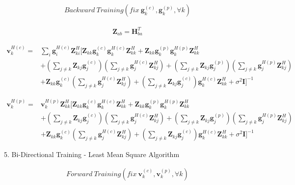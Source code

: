 \documentclass[11pt, oneside]{article}   	%
\begin{document}
\begin{align*}
Backward\ Training (fix\  \textbf{g}^{(c)}_{k}, \textbf{g}^{(p)}_{k}, \forall k)
\end{align*}

\begin{align*}
\textbf{Z}_{ab}=\textbf{H}^{T}_{ba}
\end{align*}

\begin{align*}
\textbf{v}^{H(c)}_{k} = &\displaystyle\sum_{i}	\textbf{g}^{H(c)}_{i}	\textbf{Z}^{H}_{ki} 
[
\textbf{Z}_{kk}	\textbf{g}^{(c)}_{k}	\textbf{g}^{H(c)}_{k}	\textbf{Z}^{H}_{kk}
+\textbf{Z}_{kk}	\textbf{g}^{(p)}_{k}	\textbf{g}^{H(p)}_{k}	\textbf{Z}^{H}_{kk}	\\
&+(\displaystyle\sum_{j \neq k}\textbf{Z}_{kj}\textbf{g}^{(c)}_{j})
(\displaystyle\sum_{j \neq k}\textbf{g}^{H(c)}_{j}\textbf{Z}^{H}_{kj})
+(\displaystyle\sum_{j \neq k}\textbf{Z}_{kj}\textbf{g}^{(p)}_{j})
(\displaystyle\sum_{j \neq k}\textbf{g}^{H(p)}_{j}\textbf{Z}^{H}_{kj})	\\
&+\textbf{Z}_{kk}	\textbf{g}^{(c)}_{k}
(\displaystyle\sum_{j \neq k}\textbf{g}^{H(c)}_{j}\textbf{Z}^{H}_{kj})
+(\displaystyle\sum_{j \neq k}\textbf{Z}_{kj}\textbf{g}^{(c)}_{j})
\textbf{g}^{H(c)}_{k}	\textbf{Z}^{H}_{kk}
+\sigma^2	\textbf{I}
]^{-1}	
\end{align*}

\begin{align*}
\textbf{v}^{H(p)}_{k} = &\textbf{v}^{H(p)}_{k}	\textbf{Z}^{H}_{kk} 
[
\textbf{Z}_{kk}	\textbf{g}^{(c)}_{k}	\textbf{g}^{H(c)}_{k}	\textbf{Z}^{H}_{kk}
+\textbf{Z}_{kk}	\textbf{g}^{(p)}_{k}	\textbf{g}^{H(p)}_{k}	\textbf{Z}^{H}_{kk}	\\
&+(\displaystyle\sum_{j \neq k}\textbf{Z}_{kj}\textbf{g}^{(c)}_{j})
(\displaystyle\sum_{j \neq k}\textbf{g}^{H(c)}_{j}\textbf{Z}^{H}_{kj})
+(\displaystyle\sum_{j \neq k}\textbf{Z}_{kj}\textbf{g}^{(p)}_{j})
(\displaystyle\sum_{j \neq k}\textbf{g}^{H(p)}_{j}\textbf{Z}^{H}_{kj})	\\
&+\textbf{Z}_{kk}	\textbf{g}^{(c)}_{k}
(\displaystyle\sum_{j \neq k}\textbf{g}^{H(c)}_{j}\textbf{Z}^{H}_{kj})
+(\displaystyle\sum_{j \neq k}\textbf{Z}_{kj}\textbf{g}^{(c)}_{j})
\textbf{g}^{H(c)}_{k}	\textbf{Z}^{H}_{kk}
+\sigma^2	\textbf{I}
]^{-1}	
\end{align*}

5. Bi-Directional Training - Least Mean Square Algorithm

\begin{align*}
Forward\ Training (fix\  \textbf{v}^{(c)}_{k}, \textbf{v}^{(p)}_{k}, \forall k)
\end{align*}
\end{document}
